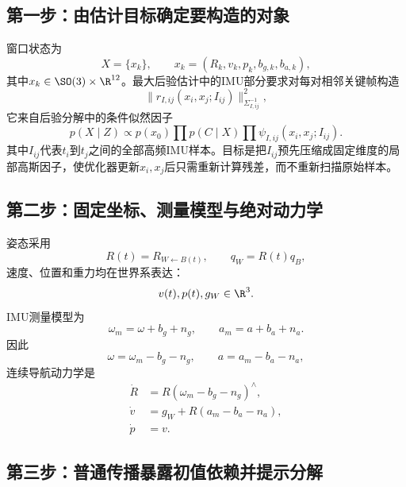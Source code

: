 \subsection*{第一步：由估计目标确定要构造的对象}

窗口状态为
\[
    X=\{x_k\},
    \qquad
    x_k=(R_k,v_k,p_k,b_{g,k},b_{a,k}),
\]
其中$x_k\in\SO(3)\times\R^{12}$。最大后验估计中的IMU部分要求对每对相邻关键帧构造
\[
    \|r_{I,ij}(x_i,x_j;I_{ij})\|_{\Sigma_{I,ij}^{-1}}^2,
\]
它来自后验分解中的条件似然因子
\[
    p(X\mid Z)
    \propto p(x_0)
    \prod p(C\mid X)
    \prod \psi_{I,ij}(x_i,x_j;I_{ij}).
\]
其中$I_{ij}$代表$t_i$到$t_j$之间的全部高频IMU样本。目标是把$I_{ij}$预先压缩成固定维度的局部高斯因子，使优化器更新$x_i,x_j$后只需重新计算残差，而不重新扫描原始样本。

\subsection*{第二步：固定坐标、测量模型与绝对动力学}

姿态采用
\[
    R(t)=R_{W\leftarrow B(t)},
    \qquad
    q_W=R(t)q_B,
\]
速度、位置和重力均在世界系表达：
\[
    v(t),p(t),g_W\in\R^3.
\]
IMU测量模型为
\[
    \omega_m=\omega+b_g+n_g,
    \qquad
    a_m=a+b_a+n_a.
\]
因此
\[
    \omega=\omega_m-b_g-n_g,
    \qquad
    a=a_m-b_a-n_a,
\]
连续导航动力学是
\[
\boxed{
\begin{aligned}
    \dot R&=R(\omega_m-b_g-n_g)^\wedge,\\
    \dot v&=g_W+R(a_m-b_a-n_a),\\
    \dot p&=v.
\end{aligned}
}
\]

\subsection*{第三步：普通传播暴露初值依赖并提示分解}


